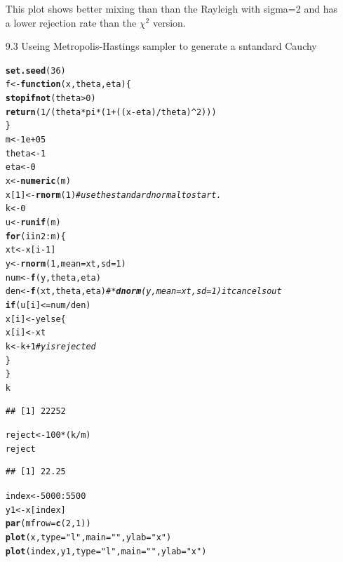 \documentclass{article}\usepackage[]{graphicx}\usepackage[]{color}
\makeatletter
\newcommand{\hlstr}[1]{\textcolor[rgb]{0.192,0.494,0.8}{#1}}%
\newcommand{\hlcom}[1]{\textcolor[rgb]{0.678,0.584,0.686}{\textit{#1}}}%
\newcommand{\hlkwd}[1]{\textcolor[rgb]{0.737,0.353,0.396}{\textbf{#1}}}%
\newenvironment{kframe}{%
 \def\at@end@of@kframe{}%
 \ifinner\ifhmode%
  \def\at@end@of@kframe{\end{minipage}}%
  \begin{minipage}{\columnwidth}%
 \fi\fi%
 \def\FrameCommand##1{\hskip\@totalleftmargin \hskip-\fboxsep
 \colorbox{shadecolor}{##1}\hskip-\fboxsep
     \hskip-\linewidth \hskip-\@totalleftmargin \hskip\columnwidth}%
 \MakeFramed {\advance\hsize-\width
   \@totalleftmargin\z@ \linewidth\hsize
   \@setminipage}}%
 {\par\unskip\endMakeFramed%
 \at@end@of@kframe}
\newenvironment{knitrout}{}{} %
\makeatother
\begin{document}
\begin{itemize}
This plot shows better mixing than than the Rayleigh with sigma=2 and has a lower rejection rate than the $\chi^2$ version.\\

\item[9.3] Useing Metropolis-Hastings sampler to generate a sntandard Cauchy

\begin{knitrout}
\color{fgcolor}\begin{kframe}
\begin{alltt}
\hlkwd{set.seed}(36)
f <- \hlkwd{function}(x, theta, eta) \{
    \hlkwd{stopifnot}(theta > 0)
    \hlkwd{return}(1/(theta * pi * (1 + ((x - eta)/theta)^2)))
\}
m <- 1e+05
theta <- 1
eta <- 0
x <- \hlkwd{numeric}(m)
x[1] <- \hlkwd{rnorm}(1)  \hlcom{#use the standard normal to start.}
k <- 0
u <- \hlkwd{runif}(m)
\hlkwd{for} (i in 2:m) \{
    xt <- x[i - 1]
    y <- \hlkwd{rnorm}(1, mean = xt, sd = 1)
    num <- \hlkwd{f}(y, theta, eta)
    den <- \hlkwd{f}(xt, theta, eta)  \hlcom{# * \hlkwd{dnorm}(y, mean = xt, sd=1) it cancels out}
    \hlkwd{if} (u[i] <= num/den) 
        x[i] <- y else \{
        x[i] <- xt
        k <- k + 1  \hlcom{#y is rejected}
    \}
\}
k
\end{alltt}
\begin{verbatim}
## [1] 22252
\end{verbatim}
\begin{alltt}
reject <- 100 * (k/m)
reject
\end{alltt}
\begin{verbatim}
## [1] 22.25
\end{verbatim}
\begin{alltt}
index <- 5000:5500
y1 <- x[index]
\hlkwd{par}(mfrow = \hlkwd{c}(2, 1))
\hlkwd{plot}(x, type = \hlstr{"l"}, main = \hlstr{""}, ylab = \hlstr{"x"})
\hlkwd{plot}(index, y1, type = \hlstr{"l"}, main = \hlstr{""}, ylab = \hlstr{"x"})
\end{alltt}
\end{kframe}

\end{knitrout}
\end{itemize}
\end{document}
